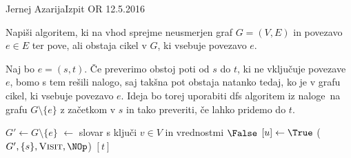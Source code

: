 \begin{naloga}{Jernej Azarija}{Izpit OR 12.5.2016}
\begin{vprasanje}
Napiši algoritem,
ki na vhod sprejme neusmerjen graf $G = (V, E)$ in povezavo $e \in E$
ter pove, ali obstaja cikel v $G$, ki vsebuje povezavo $e$.
\end{vprasanje}

\begin{odgovor}
Naj bo $e = (s, t)$. 
Če preverimo obstoj poti od $s$ do $t$, ki ne vključuje povezave $e$, 
bomo s tem rešili nalogo, saj takšna pot obstaja natanko tedaj, 
ko je v grafu cikel, ki vsebuje povezavo $e$.
Ideja bo torej uporabiti {\sc dfs} algoritem iz naloge~\nal[dfs]
na grafu $G \setminus \{e\}$ z začetkom v $s$ in tako preveriti,
če lahko pridemo do $t$.
\begin{small}
\begin{algorithmic}
	\State $G' \gets G \setminus \{e\}$
	 $\gets$ slovar s ključi $v \in V$ in vrednostmi $\False$
		$[u] \gets \True$
	\EndFunction
	($G', \{s\}, \text{\sc Visit}, \NOp$)
	\State {}$[t]$
\EndFunction
\end{algorithmic}
\end{small}
\end{odgovor}
\end{naloga}
